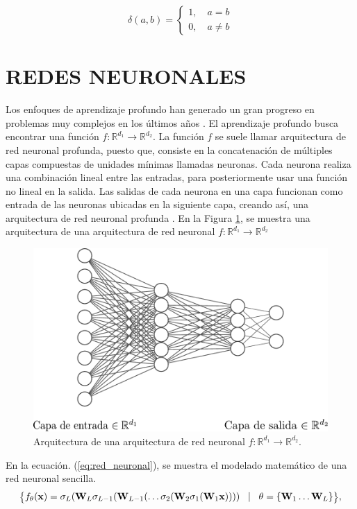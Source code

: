 \begin{equation}
    \delta(a,b) = \begin{cases}
        1, \quad a = b \\
        0, \quad a \neq b
    \end{cases}
\end{equation}
\section{REDES NEURONALES}

Los enfoques de aprendizaje profundo han generado un gran progreso en problemas muy complejos en los últimos años
. El aprendizaje profundo busca encontrar una función $f: \mathbb{R}^{d_1} \rightarrow \mathbb{R}^{d_2}$. La función $f$ se suele llamar arquitectura de red neuronal profunda, puesto que, consiste en la concatenación de múltiples capas compuestas de unidades mínimas llamadas neuronas. Cada neurona realiza una combinación lineal entre las entradas, para posteriormente usar una función no lineal en la salida. Las salidas de cada neurona en una capa funcionan como entrada de las neuronas ubicadas en la siguiente capa, creando así, una arquitectura de red neuronal profunda . En la Figura \ref{fig:nn}, se muestra una arquitectura de una arquitectura de red neuronal $f: \mathbb{R}^{d_1} \rightarrow \mathbb{R}^{d_2}$

\begin{figure}[H]
    \centering
    \includegraphics[width=0.6\linewidth]{images/nn.pdf}
    \caption{\hspace{2mm}Arquitectura de una arquitectura de red neuronal $f: \mathbb{R}^{d_1} \rightarrow \mathbb{R}^{d_2}$.}
    \label{fig:nn}
\end{figure}

En la ecuación. (\ref{eq:red_neuronal}), se muestra el modelado matemático de una red neuronal sencilla. 
\begin{equation}
    \footnotesize 
    \big\{f_\theta(\mathbf{x}) = \sigma_{L}(\mathbf{W}_{L}\sigma_{L-1}(\mathbf{W}_{L-1} (\dots \sigma_2(\mathbf{W}_2\sigma_1(\mathbf{W}_1\mathbf{x})))) \quad \vert \quad\theta = \{\mathbf{W}_{1} \dots \mathbf{W}_{L}\}  \big\},
    \label{eq:red_neuronal}
\end{equation}

